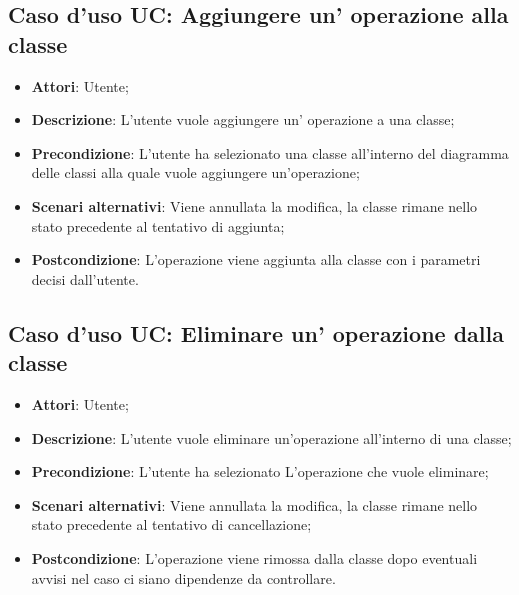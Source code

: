 \documentclass[../AnalisiDeiRequisiti.tex]{subfiles}
\begin{document}
			\subsection{Caso d'uso UC: Aggiungere un' operazione alla classe}
			\begin{itemize}
				\item \textbf{Attori}: Utente;
				
				\item \textbf{Descrizione}: L'utente vuole aggiungere un' operazione a una classe;
				
				\item \textbf{Precondizione}: L'utente ha selezionato una classe all'interno del diagramma delle classi alla quale vuole aggiungere un'operazione;
				
				\item \textbf{Scenari alternativi}: Viene annullata la modifica, la classe
				rimane nello stato precedente al tentativo di aggiunta;
				
				\item \textbf{Postcondizione}: L'operazione viene aggiunta alla classe con i parametri decisi dall'utente.
			\end{itemize}
			
			\subsection{Caso d'uso UC: Eliminare un' operazione dalla classe}
			\begin{itemize}
				\item \textbf{Attori}: Utente;
				
				\item \textbf{Descrizione}: L'utente vuole eliminare un'operazione all'interno di una classe;
				
				\item \textbf{Precondizione}: L'utente ha selezionato L'operazione che vuole eliminare;
				
				\item \textbf{Scenari alternativi}: Viene annullata la modifica, la classe
				rimane nello stato precedente al tentativo di cancellazione;
				
				\item \textbf{Postcondizione}: L'operazione viene rimossa dalla classe dopo
				eventuali avvisi nel caso ci siano dipendenze da controllare.
			\end{itemize}
			
\end{document}
